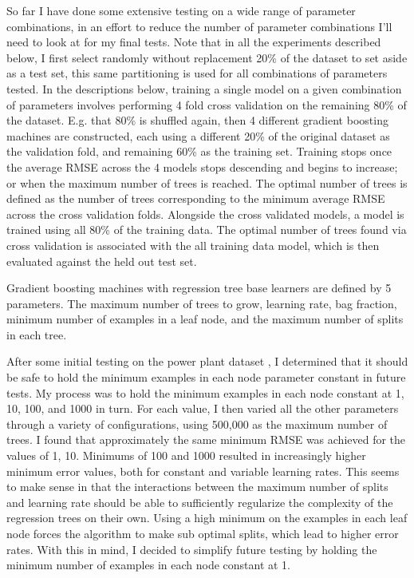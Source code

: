 \documentclass[runningheads]{llncs_2}
\begin{document}
So far I have done some extensive testing on a wide range of parameter combinations, in an effort to reduce the number of parameter combinations I'll need to look at for my final tests.  Note that in all the experiments described below, I first select randomly without replacement 20\% of the dataset to set aside as a test set, this same partitioning is used for all combinations of parameters tested. In the descriptions below, training a single model on a given combination of parameters involves performing 4 fold cross validation on the remaining 80\% of the dataset. E.g. that 80\% is shuffled again, then 4 different gradient boosting machines are constructed, each using a different 20\% of the original dataset as the validation fold, and remaining 60\% as the training set. Training stops once the average RMSE across the 4 models stops descending and begins to increase; or when the maximum number of trees is reached. The optimal number of trees is defined as the number of trees corresponding to the minimum average RMSE across the cross validation folds. Alongside the cross validated models, a model is trained using all 80\% of the training data. The optimal number of trees found via cross validation is associated with the all training data model, which is then evaluated against the held out test set.

Gradient boosting machines with regression tree base learners are defined by 5 parameters. The maximum number of trees to grow, learning rate, bag fraction, minimum number of examples in a leaf node, and the maximum number of splits in each tree.

After some initial testing on the power plant dataset \cite{powerPlantDataset}, I determined that it should be safe to hold the minimum examples in each node parameter constant in future tests. My process was to hold the minimum examples in each node constant at 1, 10, 100, and 1000 in turn. For each value, I then varied all the other parameters through a variety of configurations, using 500,000 as the maximum number of trees. I found that approximately the same minimum RMSE was achieved for the values of 1, 10. Minimums of 100 and 1000 resulted in increasingly higher minimum error values, both for constant and variable learning rates. This seems to make sense in that the interactions between the maximum number of splits and learning rate should be able to sufficiently regularize the complexity of the regression trees on their own. Using a high minimum on the examples in each leaf node forces the algorithm to make sub optimal splits, which lead to higher error rates. With this in mind, I decided to simplify future testing by holding the minimum number of examples in each node constant at 1.
\end{document}
